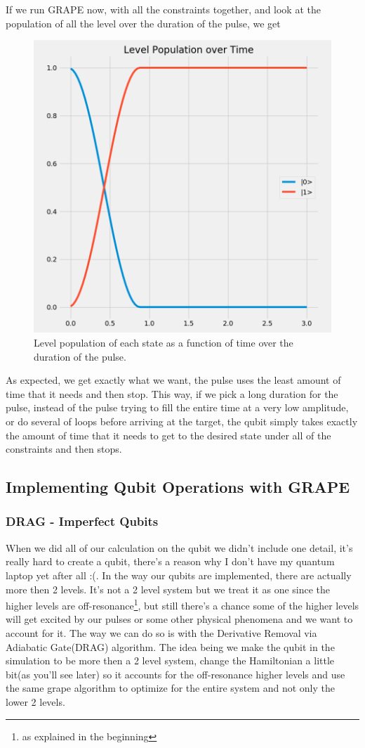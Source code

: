 \documentclass[english, a4paper, 12pt, twoside]{article}
\numberwithin{equation}{section} %
\begin{document}
If we run GRAPE now, with all the constraints together, and look at the population of all the level over the duration of the pulse, we get
\begin{figure}[H]
    \centering
    \includegraphics[width=0.5\columnwidth]{Results/duration-constraint/level-population.png}
    \caption{Level population of each state as a function of time over the duration of the pulse.}
    \label{fig:dur-penelty}
\end{figure}

As expected, we get exactly what we want, the pulse uses the least amount of time that it needs and then stop. This way, if we pick a long duration for the pulse, instead of the pulse trying to fill the entire time at a very low amplitude, or do several of loops before arriving at the target, the qubit simply takes exactly the amount of time that it needs to get to the desired state under all of the constraints and then stops.

\subsection{Implementing Qubit Operations with GRAPE}

\subsubsection{DRAG - Imperfect Qubits} \label{sec:DRAG}
When we did all of our calculation on the qubit we didn't include one detail, it's really hard to create a qubit, there's a reason why I don't have my quantum laptop yet after all :(. In the way our qubits are implemented, there are actually more then 2 levels. It's not a 2 level system but we treat it as one since the higher levels are off-resonance\footnote{as explained in the beginning}, but still there's a chance some of the higher levels will get excited by our pulses or some other physical phenomena and we want to account for it. The way we can do so is with the Derivative Removal via Adiabatic Gate(DRAG) algorithm. The idea being we make the qubit in the simulation to be more then a 2 level system, change the Hamiltonian a little bit(as you'll see later) so it accounts for the off-resonance higher levels and use the same grape algorithm to optimize for the entire system and not only the lower 2 levels.
\end{document}

